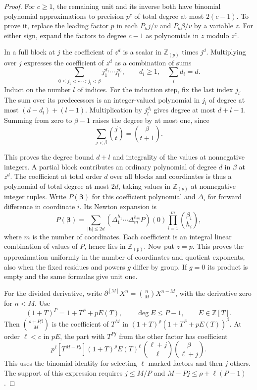 \begin{proof}
For \(c\ge1\), the remaining unit and its inverse both have binomial
polynomial approximations to precision \(p^c\) of total
degree at most \(2(c-1)\). To prove it, replace the leading
factor \(p\) in each \(P_hj/v\) and \(P_h\beta/v\) by a variable
\(z\). For either sign, expand the factors to degree \(c-1\)
as polynomials in \(z\) modulo \(z^c\).

In a full block at \(j\)
the coefficient of \(z^d\) is a scalar in \(\mathbb Z_{(p)}\)
times \(j^d\). Multiplying over \(j\) expresses the coefficient
of \(z^d\) as a combination of sums
\[
 \sum_{0\le j_1<\cdots<j_l<\beta}j_1^{d_1}\cdots j_l^{d_l},
 \qquad d_i\ge1,\quad \sum_i d_i=d.
\]
Induct on the number \(l\) of indices. For the induction step,
fix the last index \(j_l\). The sum over its predecessors is
an integer-valued polynomial in \(j_l\) of degree at most
\((d-d_l)+(l-1)\). Multiplication by \(j_l^{d_l}\) gives
degree at most \(d+l-1\). Summing from zero to \(\beta-1\)
raises the degree by at most one, since
\[
 \sum_{j<\beta}\binom jt=\binom{\beta}{t+1}.
\]

This proves the degree bound \(d+l\) and integrality of
the values at nonnegative integers. A partial block contributes an ordinary
polynomial of degree \(d\) in \(\beta\) at \(z^d\). The coefficient
at total order \(d\) over all blocks and coordinates is thus a
polynomial of total degree at most \(2d\), taking values in
\(\mathbb Z_{(p)}\) at nonnegative integer tuples. Write \(P(\boldsymbol\beta)\) for this coefficient polynomial and
\(\Delta_i\) for forward difference in coordinate \(i\). Its Newton
expansion is
\[
 P(\boldsymbol\beta)=\sum_{|\mathbf h|\le2d}
    (\Delta_1^{h_1}\cdots\Delta_m^{h_m}P)(0)
    \prod_{i=1}^{m}\binom{\beta_i}{h_i},
\]
where \(m\) is the number of coordinates. Each coefficient is an
integral linear combination of values of \(P\), hence lies in
\(\mathbb Z_{(p)}\). Now
put \(z=p\). This proves the approximation uniformly in the
number of coordinates and quotient exponents, also when the
fixed residues and powers \(g\) differ by group. If \(g=0\)
its product is empty and the same formulas give unit one.

For the divided derivative, write \(\partial^{[M]}X^n=\binom nM
X^{n-M}\), with the derivative zero for \(n<M\). Use
\[
 (1+T)^P=1+T^P+pE(T),\qquad \deg E\le P-1,
 \qquad E\in\mathbb Z[T].
\]
Then \(\binom{\rho+P\beta}{M}\) is the coefficient of \(T^M\) in
\((1+T)^\rho(1+T^P+pE(T))^\beta\). At order \(\ell<c\) in \(pE\),
the part with \(T^{Pj}\) from the other factor has coefficient
\[
 p^\ell[T^{M-Pj}](1+T)^\rho E(T)^\ell\,
       \binom{\ell+j}{\ell}\binom\beta{\ell+j}.
\]
This uses the binomial identity for selecting \(\ell\) marked
factors and then \(j\) others. The support of this expression
requires \(j\le M/P\) and \(M-Pj\le\rho+\ell(P-1)\).


\end{proof}
